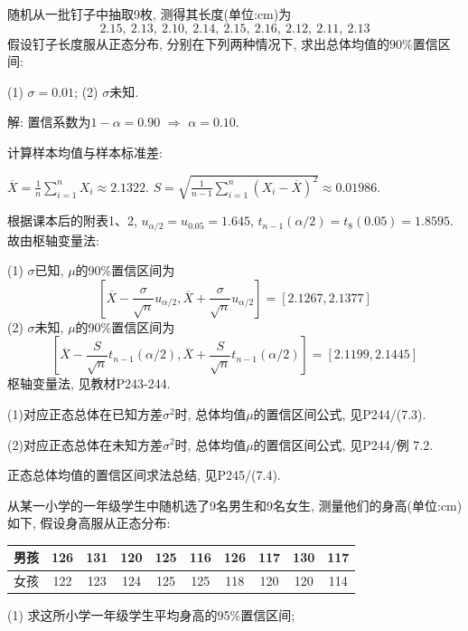 \documentclass[standard]{ExBook}
\renewenvironment{shaded}{%
  \def\FrameCommand{\fboxsep=\FrameSep \colorbox{shadecolor}}%
  \MakeFramed{\advance\hsize-\width \FrameRestore}%
}{%
  \endMakeFramed
}
\begin{document}
\begin{qitems}
    \begin{bbox}
    \begin{shaded}
        \qitem
随机从一批钉子中抽取9枚, 测得其长度(单位:cm)为
$$2.15,\ 2.13,\ 2.10,\ 2.14,\ 2.15,\ 2.16,\ 2.12,\ 2.11,\ 2.13$$
假设钉子长度服从正态分布, 分别在下列两种情况下, 求出总体均值的90\%置信区间:

(1) $\sigma=0.01$; \qquad (2) $\sigma$未知.
    \end{shaded}
    \end{bbox}

\vspace{\dimexpr2.5cm-5em\relax}

解: 置信系数为$1-\alpha=0.90$ $\Longrightarrow$ $\alpha=0.10$.

计算样本均值与样本标准差: 

$\overline{X} = \frac{1}{n}\sum_{i=1}^n X_i \approx 2.1322$. $S = \sqrt{\frac{1}{n-1}\sum_{i=1}^n (X_i - \overline{X})^2} \approx 0.01986$.

根据课本后的附表1、2, $u_{\alpha/2} = u_{0.05} = 1.645$, $t_{n-1}(\alpha/2) = t_8(0.05) = 1.8595$. 故由枢轴变量法:

(1) $\sigma$已知, $\mu$的90\%置信区间为
$$
\left[ \overline{X} - \frac{\sigma}{\sqrt{n}} u_{\alpha/2}, \overline{X} + \frac{\sigma}{\sqrt{n}} u_{\alpha/2} \right]
=
[2.1267, 2.1377]
$$
(2) $\sigma$未知, $\mu$的90\%置信区间为
$$
\left[ \overline{X} - \frac{S}{\sqrt{n}} t_{n-1}(\alpha/2), \overline{X} + \frac{S}{\sqrt{n}} t_{n-1}(\alpha/2) \right]
=
[2.1199, 2.1445]
$$
\textcolor{themeColor}{\selectfont {} 枢轴变量法, 见教材P243-244.}

\textcolor{themeColor}{\selectfont {} 
(1)对应正态总体在已知方差$\sigma^2$时, 总体均值$\mu$的置信区间公式, 见P244/(7.3).}

\textcolor{themeColor}{\selectfont {} 
(2)对应正态总体在未知方差$\sigma^2$时, 总体均值$\mu$的置信区间公式, 见P244/例 7.2.}

\textcolor{themeColor}{\selectfont {} 正态总体均值的置信区间求法总结, 见P245/(7.4).}

\vspace{2.5cm-5em}

    \begin{bbox}
    \begin{shaded}
        \qitem
从某一小学的一年级学生中随机选了9名男生和9名女生, 测量他们的身高(单位:cm)如下, 假设身高服从正态分布:
\begin{center}
\setlength{\tabcolsep}{14pt}
\begin{tabular}{c|ccccccccc}
    \hline
    男孩 & 126 & 131 & 120 & 125 & 116 & 126 & 117 & 130 & 117\\
    \hline
    女孩 & 122 & 123 & 124 & 125 & 125 & 118 & 120 & 120 & 114\\
    \hline
\end{tabular}
\end{center}
(1) 求这所小学一年级学生平均身高的95\%置信区间;


\end{shaded}
\end{bbox}
\end{qitems}
\end{document}
